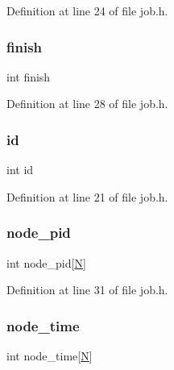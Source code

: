 Definition at line 24 of file job.\+h.

\mbox{\label{structjob_a57079404ddb95b02cddb408cc7c0e4b8}} 
\subsubsection{\texorpdfstring{finish}{finish}}
{\footnotesize\ttfamily int finish}



Definition at line 28 of file job.\+h.

\mbox{\label{structjob_a7441ef0865bcb3db9b8064dd7375c1ea}} 
\subsubsection{\texorpdfstring{id}{id}}
{\footnotesize\ttfamily int id}



Definition at line 21 of file job.\+h.

\mbox{\label{structjob_a7cf416c88da5b0c8528923c4a453b7c7}} 
\subsubsection{\texorpdfstring{node\+\_\+pid}{node\_pid}}
{\footnotesize\ttfamily int node\+\_\+pid\mbox{[}\hyperlink{shutdown_2main_8c_a0240ac851181b84ac374872dc5434ee4}{N}\mbox{]}}



Definition at line 31 of file job.\+h.

\mbox{\label{structjob_a4d48877440cfb156064d9d483b50bd2f}} 
\subsubsection{\texorpdfstring{node\+\_\+time}{node\_time}}
{\footnotesize\ttfamily int node\+\_\+time\mbox{[}\hyperlink{shutdown_2main_8c_a0240ac851181b84ac374872dc5434ee4}{N}\mbox{]}}



